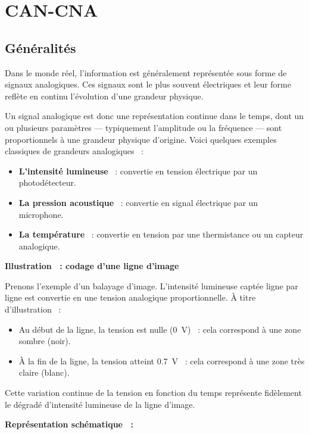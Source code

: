 \section{CAN-CNA}
\subsection{Généralités}

Dans le monde réel, l'information est généralement représentée sous forme de 
signaux analogiques. Ces signaux sont le plus souvent électriques et leur forme 
reflète en continu l'évolution d'une grandeur physique.\par

Un signal analogique est donc une représentation continue dans le temps, dont un 
ou plusieurs paramètres — typiquement l’amplitude ou la fréquence — sont 
proportionnels à une grandeur physique d’origine. Voici quelques exemples 
classiques de grandeurs analogiques ~:

\begin{itemize}
    \item \textbf{L’intensité lumineuse} ~: convertie en tension électrique par un photodétecteur.
    \item \textbf{La pression acoustique} ~: convertie en signal électrique par un microphone.
    \item \textbf{La température} ~: convertie en tension par une thermistance ou un capteur analogique.
\end{itemize}

\textbf{\sffamily Illustration ~: codage d’une ligne d’image}

Prenons l’exemple d’un balayage d’image. L’intensité lumineuse captée ligne par 
ligne est convertie en une tension analogique proportionnelle. À titre 
d’illustration ~:

\begin{itemize}
    \item Au début de la ligne, la tension est nulle (\SI{0}{\volt}) ~: cela correspond à une zone sombre (noir).
    \item À la fin de la ligne, la tension atteint \SI{0.7}{\volt} ~: cela correspond à une zone très claire (blanc).
\end{itemize}

Cette variation continue de la tension en fonction du temps représente 
fidèlement le dégradé d’intensité lumineuse de la ligne d’image.

\vspace{0.5cm}
\textbf{\sffamily Représentation schématique ~:}

